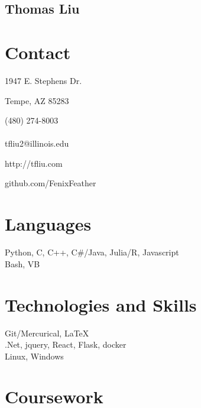 \documentclass[letterpaper,10pt]{article}
\begin{document}
\pagestyle{empty}
\begin{center}\section*{ \fontsize{48}{16}\selectfont Thomas Liu}\end{center}
\begin{minipage}[t][0em][t]{0.2\textwidth}
  \section*{\bf \huge Contact}
{\small 1947 E. Stephens Dr.

Tempe, AZ 85283

(480) 274-8003\\
~\\
tfliu2@illinois.edu

http://tfliu.com

github.com/FenixFeather
}
  \section*{\huge Languages}
  \begin{flushleft}{\small
      Python, C, C++, C\#/Java, Julia/R, Javascript\\
Bash, VB\\

    }\end{flushleft}

\section*{\huge Technologies and Skills}
  \begin{flushleft}{\small
      Git/Mercurical, LaTeX\\
.Net, jquery, React, Flask, docker\\
Linux, Windows
    }\end{flushleft}

\section*{\huge Coursework}
  \begin{flushleft}{\small

}
\end{flushleft}
\end{minipage}
\end{document}
